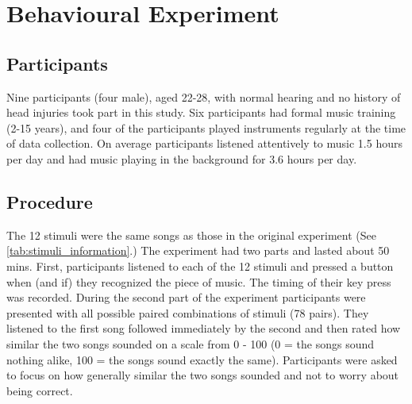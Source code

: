\chapter{Behavioural Experiment}
\section{Participants}
Nine participants (four male), aged 22-28, with normal hearing and no history of head injuries took part in this study. 
Six participants had formal music training (2-15 years), and four of the participants played instruments regularly at the time of data collection. 
On average participants listened attentively to music 1.5 hours per day and had music playing in the background for 3.6 hours per day.
\section{Procedure}
The 12 stimuli were the same songs as those in the original experiment (See \autoref{tab:stimuli_information}.)
The experiment had two parts and lasted about 50 mins.
First, participants listened to each of the 12 stimuli and pressed a button when (and if) they recognized the piece of music.
The timing of their key press was recorded. 
During the second part of the experiment participants were presented with all possible paired combinations of stimuli (78 pairs). 
They listened to the first song followed immediately by the second and then rated how similar the two songs sounded on a scale from 0 - 100 (0 = the songs sound nothing alike, 100 = the songs sound exactly the same).
Participants were asked to focus on how generally similar the two songs sounded and not to worry about being correct.
